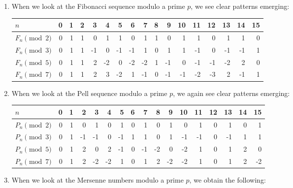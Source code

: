 \begin{example}
  \begin{enumerate}
  \item When we look at the Fibonacci sequence modulo a prime $p$, we see clear patterns emerging:
    \begin{center}
      \renewcommand{\arraystretch}{1.25}
      \begin{tabular}{l|*{16}{C}}
        $n$             & 0 & 1 & 2 & 3 & 4 & 5 & 6 & 7 & 8 & 9 & 10 & 11 & 12 & 13 & 14 & 15 \\ \midrule
        $F_n\pmod{2}$ & 0 & 1 & 1 & 0 & 1 & 1 & 0 & 1 & 1 & 0 & 1 & 1 & 0 & 1 & 1 & 0 \\
        $F_n\pmod{3}$ & 0 & 1 & 1 & -1 & 0 & -1 & -1 & 1 & 0 & 1 & 1 & -1 & 0 & -1 & -1 & 1 \\
        $F_n\pmod{5}$ & 0 & 1 & 1 & 2 & -2 & 0 & -2 & -2 & 1 & -1 & 0 & -1 & -1 & -2 & 2 & 0 \\
        $F_n\pmod{7}$ & 0 & 1 & 1 & 2 & 3 & -2 & 1 & -1 & 0 & -1 & -1 & -2 & -3 & 2 & -1 & 1
      \end{tabular}
    \end{center}
  \item When we look at the Pell sequence modulo a prime $p$, we again see clear patterns emerging:
    \begin{center}
      \renewcommand{\arraystretch}{1.25}
      \begin{tabular}{l|*{16}{C}}
        $n$             & 0 & 1 & 2 & 3 & 4 & 5 & 6 & 7 & 8 & 9 & 10 & 11 & 12 & 13 & 14 & 15 \\ \midrule
        $P_n\pmod{2}$ & 0 & 1 & 0 & 1 & 0 & 1 & 0 & 1 & 0 & 1 & 0 & 1 & 0 & 1 & 0 & 1 \\
        $P_n\pmod{3}$ & 0 & 1 & -1 & -1 & 0 & -1 & 1 & 1 & 0 & 1 & -1 & -1 & 0 & -1 & 1 & 1 \\
        $P_n\pmod{5}$ & 0 & 1 & 2 & 0 & 2 & -1 & 0 & -1 & -2 & 0 & -2 & 1 & 0 & 1 & 2 & 0 \\
        $P_n\pmod{7}$ & 0 & 1 & 2 & -2 & -2 & 1 & 0 & 1 & 2 & -2 & -2 & 1 & 0 & 1 & 2 & -2
      \end{tabular}
    \end{center}
  \item When we look at the Mersenne numbers modulo a prime $p$, we obtain the following:
    \begin{center}

\end{center}
\end{enumerate}
\end{example}
